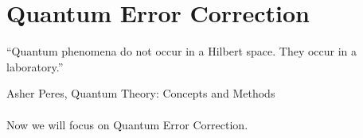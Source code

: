 \section{Quantum Error Correction}
\label{Sec: Quantum Error Correction}

\epigraph{“Quantum phenomena do not occur in a Hilbert space. They occur in a laboratory.”}{Asher Peres, Quantum Theory: Concepts and Methods}

\paragraph{}Now we will focus on Quantum Error Correction.